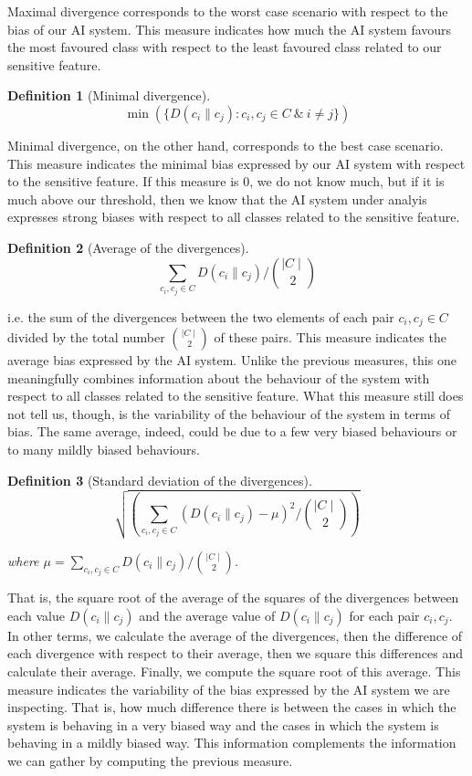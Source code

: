 \documentclass[
]{ceurart}
\newtheorem{definition}{Definition}
\begin{document}
Maximal divergence corresponds to the worst case scenario with respect to the bias of our AI system. This measure indicates how much the AI system favours the most favoured class with respect to the least favoured class related to our sensitive feature.

\begin{definition}[Minimal divergence]

$$\min (\{D(c_i\parallel c_j): c_i,c_j\in C\ \&\ i\neq j\})$$
\end{definition}

Minimal divergence, on the other hand, corresponds to the best case scenario.  This measure indicates the minimal bias expressed by our AI system with respect to the sensitive feature. If this measure is $0$, we do not know much, but if it is much above our threshold, then we know that the AI system under analyis expresses strong biases with respect to all classes related to the sensitive feature.


\begin{definition}[Average of the divergences]

$$\sum_{c_i,c_j\in C} D(c_i\parallel c_j)/\binom{\mid C\mid}{2}$$
\end{definition}

i.e. the sum of the divergences between the two elements of each pair $c_i,c_j\in C$ divided by the total number $\binom{\mid C\mid}{2}$ of these pairs. This measure indicates the average bias expressed by the AI system. Unlike the previous measures, this one meaningfully combines information about the behaviour of the system with respect to all classes related to the sensitive feature.  What this measure still does not tell us, though, is the variability of the behaviour of the system in terms of bias. The same average, indeed, could be due to a few very biased behaviours or to many mildly biased behaviours.


\begin{definition}[Standard deviation of the divergences]

\[\sqrt{ (\sum_{c_i,c_j\in C} (D(c_i\parallel c_j)-\mu)^2 / \binom{\mid C\mid}{2}  )}\]

 where  $\mu = \sum_{c_i,c_j\in C} D(c_i\parallel c_j)/\binom{\mid C\mid}{2}$. 
\end{definition} 
 
That is, the square root of the average of the squares of the divergences between each value $D(c_i\parallel c_j)$ and the average value of $D(c_i\parallel c_j)$ for each pair $c_i,c_j$. In other terms,  we calculate the average of the divergences, then the difference of each divergence with respect to their average, then we square this differences and calculate their average. Finally, we compute the square root of this average.
This measure indicates the variability of the bias expressed by the AI system we are inspecting. That is, how much difference there is between the cases in which the system is behaving in a very biased way and the cases in which the system is behaving in a mildly biased way. This information complements the information we can gather by computing the previous measure.
\end{document}
